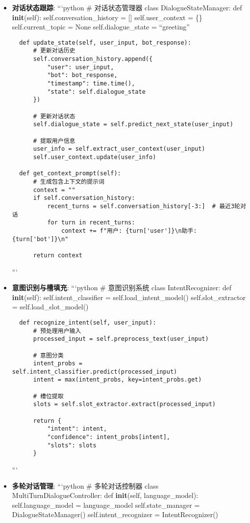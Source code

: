 \begin{itemize}
\item
  \textbf{对话状态跟踪}: ```python \# 对话状态管理器 class
  DialogueStateManager: def \textbf{init}(self):
  self.conversation\_history = {[}{]} self.user\_context = \{\}
  self.current\_topic = None self.dialogue\_state = ``greeting''

\begin{lstlisting}
  def update_state(self, user_input, bot_response):
      # 更新对话历史
      self.conversation_history.append({
          "user": user_input,
          "bot": bot_response,
          "timestamp": time.time(),
          "state": self.dialogue_state
      })

      # 更新对话状态
      self.dialogue_state = self.predict_next_state(user_input)

      # 提取用户信息
      user_info = self.extract_user_context(user_input)
      self.user_context.update(user_info)

  def get_context_prompt(self):
      # 生成包含上下文的提示词
      context = ""
      if self.conversation_history:
          recent_turns = self.conversation_history[-3:]  # 最近3轮对话
          for turn in recent_turns:
              context += f"用户: {turn['user']}\n助手: {turn['bot']}\n"

      return context
\end{lstlisting}

  ```
\item
  \textbf{意图识别与槽填充}: ```python \# 意图识别系统 class
  IntentRecognizer: def \textbf{init}(self): self.intent\_classifier =
  self.load\_intent\_model() self.slot\_extractor =
  self.load\_slot\_model()

\begin{lstlisting}
  def recognize_intent(self, user_input):
      # 预处理用户输入
      processed_input = self.preprocess_text(user_input)

      # 意图分类
      intent_probs = self.intent_classifier.predict(processed_input)
      intent = max(intent_probs, key=intent_probs.get)

      # 槽位提取
      slots = self.slot_extractor.extract(processed_input)

      return {
          "intent": intent,
          "confidence": intent_probs[intent],
          "slots": slots
      }
\end{lstlisting}

  ```
\item
  \textbf{多轮对话管理}: ```python \# 多轮对话控制器 class
  MultiTurnDialogueController: def \textbf{init}(self, language\_model):
  self.language\_model = language\_model self.state\_manager =
  DialogueStateManager() self.intent\_recognizer = IntentRecognizer()


\end{itemize}
